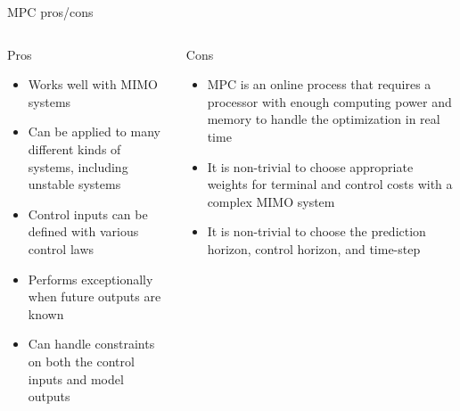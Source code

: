 \documentclass[aspectratio=169]{beamer}
\begin{document}
\begin{frame}{MPC pros/cons}
    \begin{columns}
    
    \begin{column}{0.5\textwidth}
    \centering
    Pros\\
    \hline
    \hfill
    \begin{itemize}
        \item Works well with MIMO systems
        \item Can be applied to many different kinds of systems, including unstable systems
        \item Control inputs can be defined with various control laws
        \item Performs exceptionally when future outputs are known
        \item Can handle constraints on both the control inputs and model outputs
    \end{itemize}
    \end{column}
    \begin{column}{0.5\textwidth}
    \centering
    Cons
    
    \hline
    \hfill
    \begin{itemize}
        \item MPC is an online process that requires a processor with enough computing power and memory to handle the optimization in real time
        \item It is non-trivial to choose appropriate weights for terminal and control costs with a complex MIMO system
        \item It is non-trivial to choose the prediction horizon, control horizon, and time-step
        
    \end{itemize}
    \end{column}
    \end{columns}
\end{frame}
\end{document}
